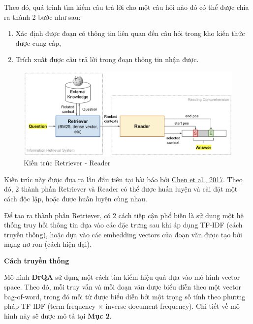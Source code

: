 Theo đó, quá trình tìm kiếm câu trả lời cho một câu hỏi nào đó có thể được chia ra thành 2 bước như sau:
\begin{enumerate}
    \item Xác định được đoạn có thông tin liên quan đến câu hỏi trong kho kiến thức được cung cấp,
    \item Trích xuất được câu trả lời trong đoạn thông tin nhận được.
\end{enumerate}

\begin{figure}[h!]
    \centering
    \includegraphics[width=\linewidth]{img/arch/QA-retriever-reader.png}
    \caption{Kiến trúc Retriever - Reader}
    \label{fig:arch_rr}
\end{figure}

Kiến trúc này được đưa ra lần đầu tiên tại bài báo  bởi \href{https://arxiv.org/abs/1704.00051}{Chen et al., 2017}. Theo đó, 2 thành phần Retriever và Reader có thể được huấn luyện và cài đặt một cách độc lập, hoặc được huấn luyện cùng nhau.

Để tạo ra thành phần Retriever, có 2 cách tiếp cận phổ biến là sử dụng một hệ thống truy hồi thông tin dựa vào các đặc trưng sau khi áp dụng TF-IDF (cách truyền thống), hoặc dựa vào các embedding vectors của đoạn văn được tạo bởi mạng nơ-ron (cách hiện đại).\\

\begin{flushleft}
\textbf{Cách truyền thống}\\
\end{flushleft}

Mô hình \textbf{DrQA} sử dụng một cách tìm kiếm hiệu quả dựa vào mô hình vector space. Theo đó, mỗi truy vấn và mỗi đoạn văn được biểu diễn theo một vector bag-of-word, trong đó mỗi từ được biểu diễn bởi một trọng số tính theo phương pháp TF-IDF (term frequency $\times$ inverse document frequency). Chi tiết về mô hình này sẽ được mô tả tại \textbf{Mục 2}.\\

